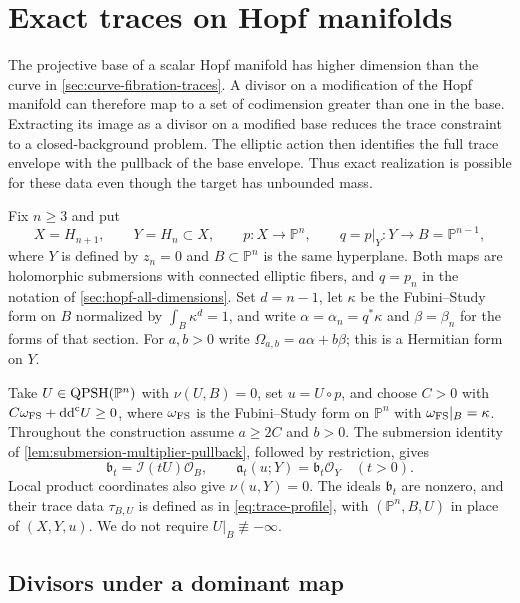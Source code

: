 \section{Exact traces on Hopf manifolds}
\label{sec:hopf-projective-traces}

The projective base of a scalar Hopf manifold has higher dimension than the curve in \cref{sec:curve-fibration-traces}. A divisor on a modification of the Hopf manifold can therefore map to a set of codimension greater than one in the base. Extracting its image as a divisor on a modified base reduces the trace constraint to a closed-background problem. The elliptic action then identifies the full trace envelope with the pullback of the base envelope. Thus exact realization is possible for these data even though the target has unbounded mass.

Fix $n\geq3$ and put
\[
 X=H_{n+1},\qquad Y=H_n\subset X,\qquad
 p\colon X\longrightarrow\mathbb P^n,\qquad
 q=p|_Y\colon Y\longrightarrow B=\mathbb P^{n-1},
\]
where $Y$ is defined by $z_n=0$ and $B\subset\mathbb P^n$ is the same hyperplane. Both maps are holomorphic submersions with connected elliptic fibers, and $q=p_n$ in the notation of \cref{sec:hopf-all-dimensions}. Set $d=n-1$, let $\kappa$ be the Fubini--Study form on $B$ normalized by $\int_B\kappa^d=1$, and write $\alpha=\alpha_n=q^*\kappa$ and $\beta=\beta_n$ for the forms of that section. For $a,b>0$ write $\Omega_{a,b}=a\alpha+b\beta$; this is a Hermitian form on $Y$.

Take $U\in\mathrm{QPSH}(\mathbb P^n)$ with $\nu(U,B)=0$, set $u=U\circ p$, and choose $C>0$ with $C\omega_{\mathrm{FS}}+\mathrm{dd}^{\mathrm{c}} U\geq0$, where $\omega_{\mathrm{FS}}$ is the Fubini--Study form on $\mathbb P^n$ with $\omega_{\mathrm{FS}}|_B=\kappa$. Throughout the construction assume $a\geq2C$ and $b>0$. The submersion identity of \cref{lem:submersion-multiplier-pullback}, followed by restriction, gives
\begin{equation}\label{eq:hopf-trace-image-ideals}
 \mathfrak b_t=\mathcal I(tU)\mathcal O_B,
 \qquad
 \mathfrak a_t(u;Y)=\mathfrak b_t\mathcal O_Y
 \quad(t>0).
\end{equation}
Local product coordinates also give $\nu(u,Y)=0$. The ideals $\mathfrak b_t$ are nonzero, and their trace data $\tau_{B,U}$ is defined as in \eqref{eq:trace-profile}, with $(\mathbb P^n,B,U)$ in place of $(X,Y,u)$. We do not require $U|_B\not\equiv-\infty$.

\subsection{Divisors under a dominant map}

